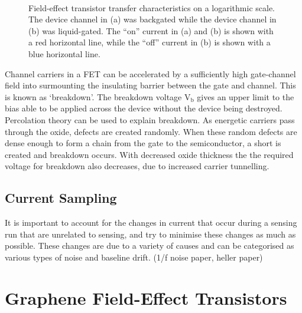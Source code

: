 \documentclass[
  a4paper,
]{scrbook}
\begin{document}
\begin{figure}
\begin{minipage}[t]{0.45\linewidth}
{{}

}

\end{minipage}%
%
\begin{minipage}[t]{0.01\linewidth}

{\centering 

~

}

\end{minipage}%

\caption{\label{fig-gating-transfer}Field-effect transistor transfer
characteristics on a logarithmic scale. The device channel in (a) was
backgated while the device channel in (b) was liquid-gated. The ``on''
current in (a) and (b) is shown with a red horizontal line, while the
``off'' current in (b) is shown with a blue horizontal line.}

\end{figure}

Channel carriers in a FET can be accelerated by a sufficiently high
gate-channel field into surmounting the insulating barrier between the
gate and channel. This is known as `breakdown'. The breakdown voltage
V\(_\textrm{b}\) gives an upper limit to the bias able to be applied
across the device without the device being destroyed. Percolation theory
can be used to explain breakdown. As energetic carriers pass through the
oxide, defects are created randomly. When these random defects are dense
enough to form a chain from the gate to the semiconductor, a short is
created and breakdown occurs. With decreased oxide thickness the the
required voltage for breakdown also decreases, due to increased carrier
tunnelling.

\hypertarget{current-sampling}{%
\subsection{Current Sampling}\label{current-sampling}}

It is important to account for the changes in current that occur during
a sensing run that are unrelated to sensing, and try to minimise these
changes as much as possible. These changes are due to a variety of
causes and can be categorised as various types of noise and baseline
drift. (1/f noise paper, heller paper)

\hypertarget{graphene-field-effect-transistors}{%
\section{Graphene Field-Effect
Transistors}\label{graphene-field-effect-transistors}}
\end{document}
